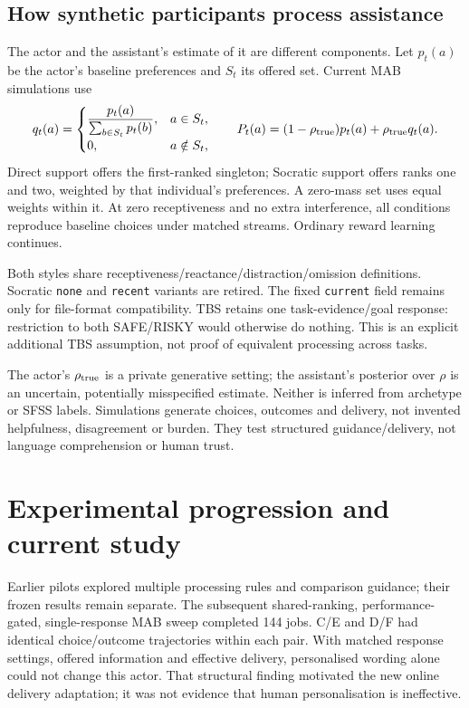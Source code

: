 \documentclass[11pt,a4paper]{article}
\begin{document}
\subsection{How synthetic participants process assistance}
The actor and the assistant's estimate of it are different components. Let $p_t(a)$ be the actor's baseline preferences and $S_t$ its offered set. Current MAB simulations use
\[
 q_t(a)=
 \begin{cases}
 \displaystyle\frac{p_t(a)}{\sum_{b\in S_t}p_t(b)}, & a\in S_t,\\[4pt]
 0, & a\notin S_t,
 \end{cases}
 \qquad
 P_t(a)=(1-\rho_{\rm true})p_t(a)+\rho_{\rm true}q_t(a).
\]
Direct support offers the first-ranked singleton; Socratic support offers ranks one and two, weighted by that individual's preferences. A zero-mass set uses equal weights within it. At zero receptiveness and no extra interference, all conditions reproduce baseline choices under matched streams. Ordinary reward learning continues.

Both styles share receptiveness/reactance/distraction/omission definitions. Socratic \texttt{none} and \texttt{recent} variants are retired. The fixed \texttt{current} field remains only for file-format compatibility. TBS retains one task-evidence/goal response: restriction to both SAFE/RISKY would otherwise do nothing. This is an explicit additional TBS assumption, not proof of equivalent processing across tasks.

The actor's $\rho_{\rm true}$ is a private generative setting; the assistant's posterior over $\rho$ is an uncertain, potentially misspecified estimate. Neither is inferred from archetype or SFSS labels. Simulations generate choices, outcomes and delivery, not invented helpfulness, disagreement or burden. They test structured guidance/delivery, not language comprehension or human trust.

\section{Experimental progression and current study}
Earlier pilots explored multiple processing rules and comparison guidance; their frozen results remain separate. The subsequent shared-ranking, performance-gated, single-response MAB sweep completed 144 jobs. C/E and D/F had identical choice/outcome trajectories within each pair. With matched response settings, offered information and effective delivery, personalised wording alone could not change this actor. That structural finding motivated the new online delivery adaptation; it was not evidence that human personalisation is ineffective.
\end{document}
